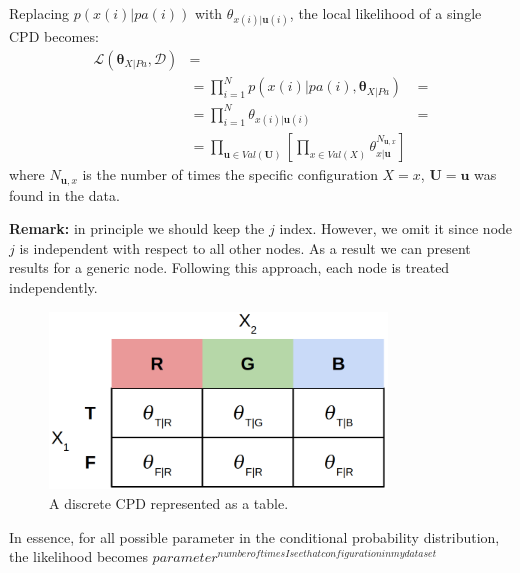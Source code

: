 Replacing $p(x(i)|\mathit{pa}(i))$ with $\theta_{x(i)|\pmb{u}(i)}$, the local likelihood
of a single CPD becomes:
\begin{align*}
	\mathcal{L}(\pmb{\theta}_{X|\mathit{Pa}}, \mathcal{D}) & =                                                                                                            \\
	                                                       & = \prod_{i=1}^{N} p(x(i)|\mathit{pa}(i), \pmb{\theta}_{X|\mathit{Pa}})                                      & = \\
	                                                       & = \prod_{i=1}^{N} \theta_{x(i)|\pmb{u}(i)}                                                                  & = \\
	                                                       & = \prod_{\pmb{u} \in \mathit{Val}(\pmb{U})}[\prod_{x \in \mathit{Val}(X)}\theta^{N_{\pmb{u},x}}_{x|\pmb{u}}]
\end{align*}
where $N_{\pmb{u},x}$ is the number of times the specific configuration $X=x$, $\pmb
{U}=\pmb{u}$ was found in the data.
\newline

\textbf{Remark:} in principle we should keep the $j$ index. However, we omit it
since node $j$ is independent with respect to all other nodes. As a result we can
present results for a generic node. Following this approach, each node is treated
independently.
\newline

\begin{figure}[H]
	\centering
	\includegraphics[width=0.8\textwidth]{
		images/10_BayesianNetworksLearning_discreteDistributionTable.png
	}
	\caption{A discrete CPD represented as a table.}
	\label{fig:exampleMaximumLikelihoodEstimationCompleteData}
\end{figure}

In essence, for all possible parameter in the conditional probability distribution,
the likelihood becomes
$\mathit{parameter}^{\mathit{number of times I see that configuration in my
dataset}}$
\newline

